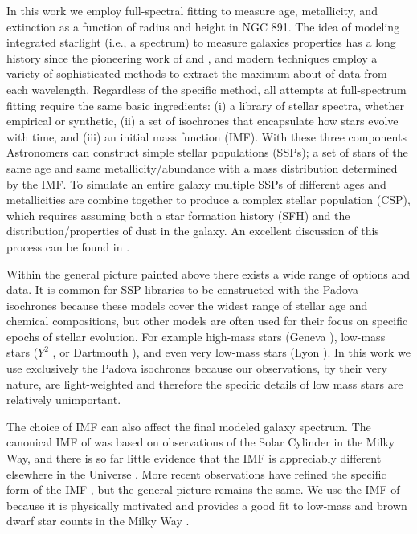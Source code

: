 In this work we employ full-spectral fitting to measure age,
metallicity, and extinction as a function of radius and height in NGC
891. The idea of modeling integrated starlight (i.e., a spectrum) to
measure galaxies properties has a long history since the pioneering
work of \citet{Tinsley68} and \citet{Spinrad71}, and modern techniques
employ a variety of sophisticated methods to extract the maximum about
of data from each wavelength. Regardless of the specific method, all
attempts at full-spectrum fitting require the same basic ingredients:
(i) a library of stellar spectra, whether empirical or synthetic, (ii)
a set of isochrones that encapsulate how stars evolve with time, and
(iii) an initial mass function (IMF). With these three components
Astronomers can construct simple stellar populations (SSPs); a set of
stars of the same age and same metallicity/abundance with a mass
distribution determined by the IMF. To simulate an entire galaxy
multiple SSPs of different ages and metallicities are combine together
to produce a complex stellar population (CSP), which requires assuming
both a star formation history (SFH) and the distribution/properties of
dust in the galaxy. An excellent discussion of this process can be
found in \citet[and his diagram shown in Figure
\ref{intro:fig:conroy}]{Conroy13}.

Within the general picture painted above there exists a wide range of
options and data. It is common for SSP libraries to be constructed
with the Padova isochrones \citep{Bertelli94, Girardi00, Marigo08}
because these models cover the widest range of stellar age and
chemical compositions, but other models are often used for their focus
on specific epochs of stellar evolution. For example high-mass stars
(Geneva \citep{Schaller92,Meynet00}), low-mass stars ($Y^2$
\citep{Yi01,Yi03}, or Dartmouth \citep{Dotter08}), and even very
low-mass stars (Lyon \citep{Chabrier97,Baraffe98}). In this work we
use exclusively the Padova isochrones because our observations, by
their very nature, are light-weighted and therefore the specific
details of low mass stars are relatively unimportant.

The choice of IMF can also affect the final modeled galaxy
spectrum. The canonical IMF of \citet{Salpeter55} was based on
observations of the Solar Cylinder in the Milky Way, and there is so
far little evidence that the IMF is appreciably different elsewhere in
the Universe \citep{Bastian10}. More recent observations have refined
the specific form of the IMF \citep{Kroupa01, Chabrier03}, but the
general picture remains the same. We use the IMF of \citet{Chabrier03}
because it is physically motivated and provides a good fit to low-mass
and brown dwarf star counts in the Milky Way
\citep{Bruzual03,Chabrier01,Chabrier03}.

